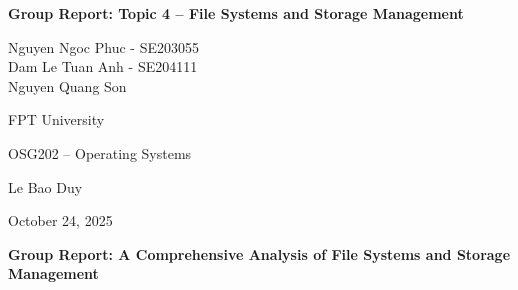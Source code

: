 \documentclass[12pt]{article}
\begin{document}
\begin{titlepage}
    \thispagestyle{fancy} %
    \centering
    
    \vspace*{3\baselineskip} %
    
    {\Large \bfseries Group Report: Topic 4 – File Systems and Storage Management\par}
    
    \vspace{2\baselineskip} %
    
    {\large
        Nguyen Ngoc Phuc - SE203055 \\
        Dam Le Tuan Anh - SE204111\\
        Nguyen Quang Son\\
    }
    
    \vspace{1.5cm}
    
    {\large FPT University\par} %
    
    \vspace{1.5cm}
    
    {\large OSG202 – Operating Systems\par}
    
    \vspace{1.5cm}
    
    {\large Le Bao Duy\par}
    
    \vspace{1.5cm}
    
    {\large October 24, 2025\par}
    
\end{titlepage}

\onehalfspacing 

\tableofcontents
\newpage


\begin{center}
    \large \bfseries Group Report: A Comprehensive Analysis of File Systems and Storage Management
\end{center}
\vspace{1\baselineskip} %
\end{document}
